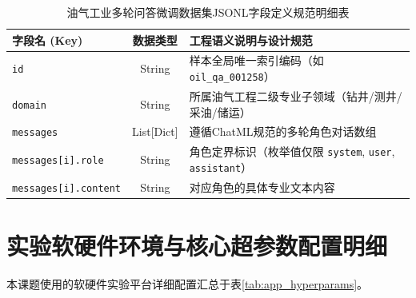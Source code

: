 \documentclass[UTF8,a4paper,zihao=-4,openany,twoside]{ctexbook}
\begin{document}
\begin{table}[htbp]
\centering
\caption{油气工业多轮问答微调数据集JSONL字段定义规范明细表}
\label{tab:app_dataset_schema}
\begin{tabularx}{\textwidth}{lcX}
\toprule
\textbf{字段名 (Key)} & \textbf{数据类型} & \textbf{工程语义说明与设计规范} \\
\midrule
\texttt{id} & String & 样本全局唯一索引编码（如 \texttt{oil\_qa\_001258}） \\
\texttt{domain} & String & 所属油气工程二级专业子领域（钻井/测井/采油/储运） \\
\texttt{messages} & List[Dict] & 遵循ChatML规范的多轮角色对话数组 \\
\texttt{messages[i].role} & String & 角色定界标识（枚举值仅限 \texttt{system}, \texttt{user}, \texttt{assistant}） \\
\texttt{messages[i].content} & String & 对应角色的具体专业文本内容 \\
\bottomrule
\end{tabularx}
\end{table}

\chapter{实验软硬件环境与核心超参数配置明细}
\label{app:hyperparams}

本课题使用的软硬件实验平台详细配置汇总于表\ref{tab:app_hyperparams}。
\end{document}
